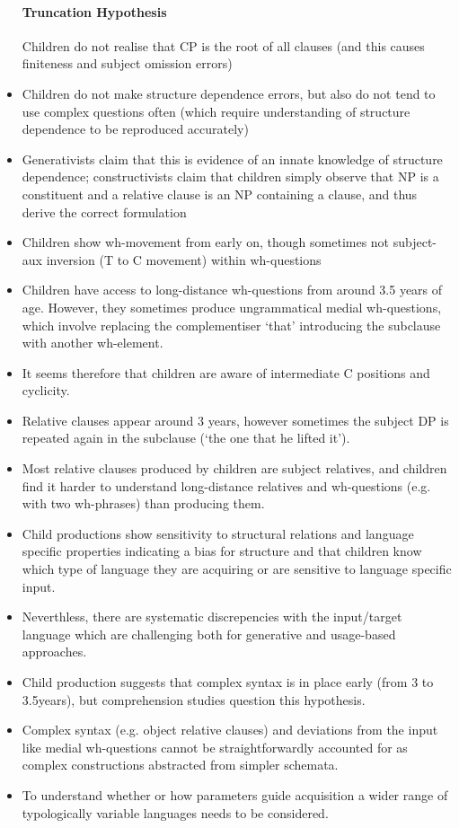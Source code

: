 \documentclass{article}
\begin{document}
\begin{itemize}
    \paragraph{Truncation Hypothesis} Children do not realise that CP is the root of all clauses (and this causes finiteness and subject omission errors)
    \item Children do not make structure dependence errors, but also do not tend to use complex questions often (which require understanding of structure dependence to be reproduced accurately)
    \item Generativists claim that this is evidence of an innate knowledge of structure dependence; constructivists claim that children simply observe that NP is a constituent and a relative clause is an NP containing a clause, and thus derive the correct formulation
    \item Children show wh-movement from early on, though sometimes not subject-aux inversion (T to C movement) within wh-questions
    \item Children have access to long-distance wh-questions from around 3.5 years of age. However, they sometimes produce ungrammatical medial wh-questions, which involve replacing the complementiser `that' introducing the subclause with another wh-element.
    \item It seems therefore that children are aware of intermediate C positions and cyclicity.
    \item Relative clauses appear around 3 years, however sometimes the subject DP is repeated again in the subclause (`the one that he lifted it').
    \item Most relative clauses produced by children are subject relatives, and children find it harder to understand long-distance relatives and wh-questions (e.g. with two wh-phrases) than producing them.
    \item Child productions show sensitivity to structural relations and language specific properties indicating a bias for structure and that children know which type of language they are acquiring or are sensitive to language specific input.
    \item Neverthless, there are systematic discrepencies with the input/target language which are challenging both for generative and usage-based approaches.
    \item Child production suggests that complex syntax is in place early (from 3 to 3.5years), but comprehension studies question this hypothesis.
    \item Complex syntax (e.g. object relative clauses) and deviations from the input like medial wh-questions cannot be straightforwardly accounted for as complex constructions abstracted from simpler schemata.
    \item To understand whether or how parameters guide acquisition a wider range of typologically variable languages needs to be considered.
\end{itemize}
\end{document}
